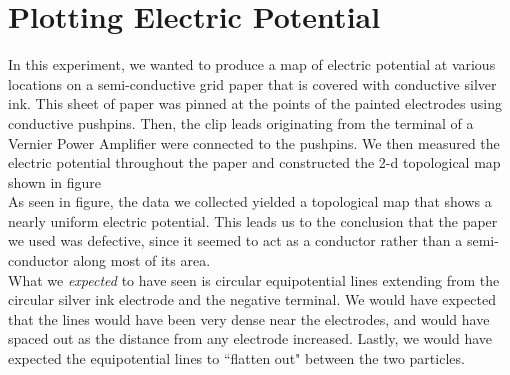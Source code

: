 \documentclass[oneside,12pt]{amsart}
\begin{document}
	\section{Plotting Electric Potential}
		In this experiment, we wanted to produce a map of electric potential at various locations on a semi-conductive grid paper that is covered with conductive silver ink. This sheet of paper was pinned at the points of the painted electrodes using conductive pushpins. Then, the clip leads originating from the terminal of a Vernier Power Amplifier were connected to the pushpins. We then measured the electric potential throughout the paper and constructed the 2-d topological map shown in figure\\ %
		\indent As seen in figure, the data we collected yielded a topological map that shows a nearly uniform electric potential. This leads us to the conclusion that the paper we used was defective, since it seemed to act as a conductor rather than a semi-conductor along most of its area.\\
		
		\indent What we \textit{expected} to have seen is circular equipotential lines extending from the circular silver ink electrode and the negative terminal. We would have expected that the lines would have been very dense near the electrodes, and would have spaced out as the distance from any electrode increased. Lastly, we would have expected the equipotential lines to ``flatten out" between the two particles.\\
		
\end{document}
